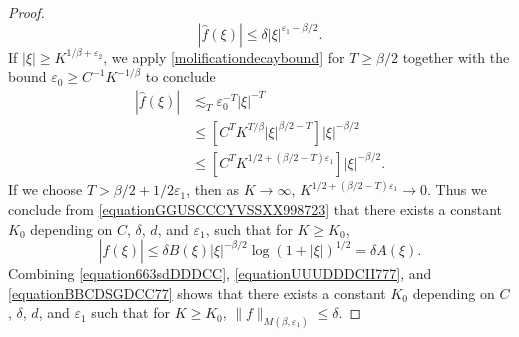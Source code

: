 \documentclass[12pt,reqno]{article}
\numberwithin{equation}{section}
\begin{document}
\begin{proof}
    \begin{equation} \label{equationUUUDDDCII777}
        |\widehat{f}(\xi)| \leq \delta |\xi|^{\varepsilon_1-\beta/2}.
    \end{equation}
    If $|\xi| \geq K^{1/\beta + \varepsilon_2}$, we apply \eqref{molificationdecaybound} for $T \geq \beta/2$ together with the bound $\varepsilon_0 \geq C^{-1} K^{-1/\beta}$ to conclude
    \begin{equation} \label{equationGGUSCCCYVSSXX998723}
    \begin{split}
        |\widehat{f}(\xi)| &\lesssim_T \varepsilon_0^{-T} |\xi|^{-T}\\
        &\leq \left[ C^T K^{T/\beta} |\xi|^{\beta/2 - T} \right] |\xi|^{-\beta/2}\\
        &\leq \left[ C^T K^{1/2 + (\beta/2 - T) \varepsilon_1} \right] |\xi|^{-\beta/2}.
    \end{split}
    \end{equation}
    If we choose $T > \beta/2 + 1/2 \varepsilon_1$, then as $K \to \infty$, $K^{1/2 + (\beta/2 - T) \varepsilon_1} \to 0$. Thus we conclude from \eqref{equationGGUSCCCYVSSXX998723} that there exists a constant $K_0$ depending on $C$, $\delta$, $d$, and $\varepsilon_1$, such that for $K \geq K_0$,
    \begin{equation} \label{equationBBCDSGDCC77}
        |\widehat{f}(\xi)| \leq \delta B(\xi) |\xi|^{-\beta/2} \log(1 + |\xi|)^{1/2} = \delta A(\xi).
    \end{equation}
    Combining \eqref{equation663sdDDDCC}, \eqref{equationUUUDDDCII777}, and \eqref{equationBBCDSGDCC77} shows that there exists a constant $K_0$ depending on $C$, $\delta$, $d$, and $\varepsilon_1$ such that for $K \geq K_0$, $\| f \|_{M(\beta,\varepsilon_1)} \leq \delta$.
\begin{comment}



\end{comment}
\end{proof}
\end{document}
